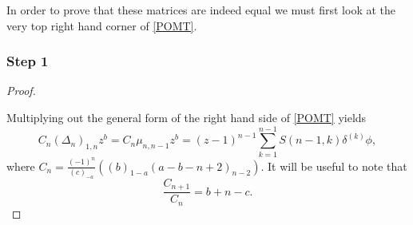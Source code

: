 \documentclass[12pt]{article}
\numberwithin{figure}{section}
\numberwithin{equation}{section}
\numberwithin{table}{section}
\begin{document}
In order to prove that these matrices are indeed equal we must first look at the very top right hand corner of \eqref{POMT}.
\subsubsection{Step 1}
\begin{proof}\label{main thm}

Multiplying out the general form of the right hand side of \eqref{POMT} yields
\begin{equation}
C_n(\Delta_n)_{1,n}z^b=C_n \mu_{n,n-1}z^b=(z-1)^{n-1}\sum^{n-1}_{k=1}S(n-1,k)\delta^{(k)}\phi,\label{step1}
\end{equation}
where $C_n=\frac{(-1)^n}{(c)_{-a}}((b)_{1-a}(a-b-n+2)_{n-2})$.
It will be useful to note that $$\frac{C_{n+1}}{C_{n}}=b+n-c.$$


\end{proof}
\end{document}
